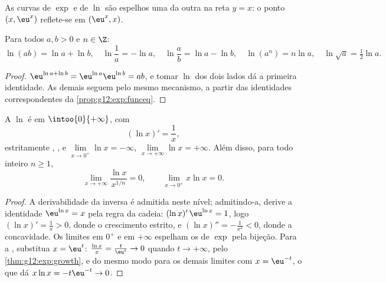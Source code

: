 \begin{omfigure}

{\small As curvas de $\exp$ e de $\ln$ são espelhos uma da outra na reta
$y = x$: o ponto $(x, \eu^x)$ reflete-se em $(\eu^x, x)$.}
\end{omfigure}

\begin{proposition}\label{prop:g12:exp:lnalg}
Para todos $a, b > 0$ e $n \in \Z$:
\[
\ln(ab) = \ln a + \ln b, \quad
\ln\frac{1}{a} = -\ln a, \quad
\ln\frac{a}{b} = \ln a - \ln b, \quad
\ln(a^n) = n \ln a, \quad
\ln\sqrt{a} = \tfrac12 \ln a .
\]
\end{proposition}

\begin{proof}
$\eu^{\ln a + \ln b} = \eu^{\ln a}\eu^{\ln b} = ab$, e tomar $\ln$ dos dois
lados dá a primeira identidade. As demais seguem pelo mesmo mecanismo, a
partir das identidades correspondentes da \cref{prop:g12:exp:funceq}.
\end{proof}

\begin{proposition}\label{prop:g12:exp:lnanalytic}
A  $\ln$ é  em $\intoo{0}{+\infty}$, com
\[
(\ln x)' = \frac{1}{x},
\]
estritamente , , e
$\lim\limits_{x\to0^+} \ln x = -\infty$,
$\lim\limits_{x\to+\infty} \ln x = +\infty$. Além disso, para todo inteiro
$n \geq 1$,
\[
\lim_{x\to+\infty} \frac{\ln x}{x^{1/n}} = 0, \qquad
\lim_{x\to0^+} x \ln x = 0 .
\]
\end{proposition}

\begin{proof}
A derivabilidade da  inversa é admitida neste nível; admitindo-a,
derive a identidade $\eu^{\ln x} = x$ pela regra da cadeia:
$(\ln x)'\,\eu^{\ln x} = 1$, logo $(\ln x)' = \frac{1}{x} > 0$, donde o
crescimento estrito, e $(\ln x)'' = -\frac1{x^2} < 0$, donde a
concavidade. Os limites em $0^+$ e em $+\infty$ espelham os de $\exp$ pela
bijeção. Para a , substitua $x = \eu^{t}$:
$\frac{\ln x}{x} = \frac{t}{\eu^t} \to 0$ quando $t \to +\infty$, pelo
\cref{thm:g12:exp:growth}, e do mesmo modo para os demais limites com
$x = \eu^{-t}$, o que dá $x\ln x = -t\eu^{-t} \to 0$.
\end{proof}

